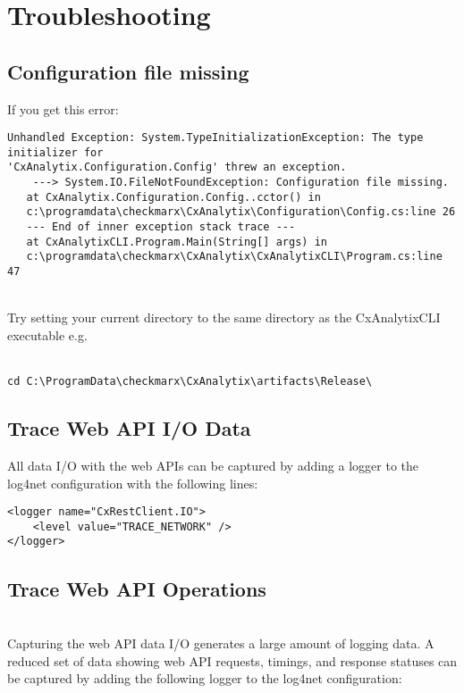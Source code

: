 \chapter{Troubleshooting}

\section{Configuration file missing}
If you get this error:

\begin{lstlisting}
Unhandled Exception: System.TypeInitializationException: The type initializer for 
'CxAnalytix.Configuration.Config' threw an exception. 
    ---> System.IO.FileNotFoundException: Configuration file missing.
   at CxAnalytix.Configuration.Config..cctor() in 
   c:\programdata\checkmarx\CxAnalytix\Configuration\Config.cs:line 26
   --- End of inner exception stack trace ---
   at CxAnalytixCLI.Program.Main(String[] args) in 
   c:\programdata\checkmarx\CxAnalytix\CxAnalytixCLI\Program.cs:line 47
\end{lstlisting}

\noindent\\Try setting your current directory to the same directory as the CxAnalytixCLI executable e.g.

\noindent\\\texttt{cd C:\textbackslash ProgramData\textbackslash checkmarx\textbackslash CxAnalytix\textbackslash artifacts\textbackslash Release\textbackslash}


\section{Trace Web API I/O Data}

All data I/O with the web APIs can be captured by adding a logger to the log4net configuration with the following lines:

\begin{lstlisting}
<logger name="CxRestClient.IO">
    <level value="TRACE_NETWORK" />
</logger>
\end{lstlisting}

\section{Trace Web API Operations}

\noindent\\Capturing the web API data I/O generates a large amount of logging data.  A reduced set of data showing web API requests, timings, and 
response statuses can be captured by adding the following logger to the log4net configuration:

